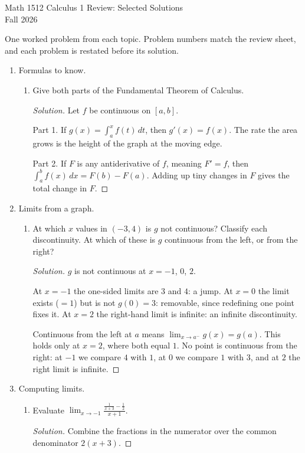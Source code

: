 \documentclass[12pt]{article}
\newenvironment{solution}
  {\renewcommand\qedsymbol{$\blacksquare$}\begin{proof}[Solution]}
  {\end{proof}}
\begin{document}
\raggedright
\begin{center}
      {\large Math 1512 Calculus 1 Review: Selected Solutions}\\
  {Fall 2026}\\

\end{center}

One worked problem from each topic. Problem numbers match the review sheet, and each problem is restated before its solution.


\begin{enumerate}
\item[1.] Formulas to know.
\begin{enumerate}
\item[(c)] Give both parts of the Fundamental Theorem of Calculus.
\begin{solution}
Let $f$ be continuous on $[a,b]$.

Part 1. If $g(x) = \int_a^x f(t)\,dt$, then $g'(x) = f(x)$. The rate the area grows is the height of the graph at the moving edge.

Part 2. If $F$ is any antiderivative of $f$, meaning $F' = f$, then $\int_a^b f(x)\,dx = F(b) - F(a)$. Adding up tiny changes in $F$ gives the total change in $F$.
\end{solution}
\end{enumerate}
\item[2.] Limits from a graph.
\begin{enumerate}
\item[(b)] At which $x$ values in $(-3,4)$ is $g$ not continuous? Classify each discontinuity. At which of these is $g$ continuous from the left, or from the right?
\begin{solution}
$g$ is not continuous at $x=-1$, $0$, $2$.

At $x=-1$ the one-sided limits are $3$ and $4$: a jump. At $x=0$ the limit exists ($=1$) but is not $g(0)=3$: removable, since redefining one point fixes it. At $x=2$ the right-hand limit is infinite: an infinite discontinuity.

Continuous from the left at $a$ means $\lim_{x\to a^-} g(x) = g(a)$. This holds only at $x=2$, where both equal $1$. No point is continuous from the right: at $-1$ we compare $4$ with $1$, at $0$ we compare $1$ with $3$, and at $2$ the right limit is infinite.
\end{solution}
\end{enumerate}
\item[3.] Computing limits.
\begin{enumerate}
\item[(c)] Evaluate $\lim_{x \to -1} \frac{\frac{1}{x+3} - \frac{1}{2}}{x+1}$.
\begin{solution}
Combine the fractions in the numerator over the common denominator $2(x+3)$.


\end{solution}
\end{enumerate}
\end{enumerate}
\end{document}
